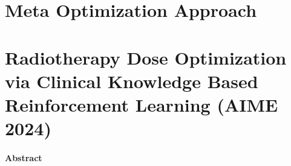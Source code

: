 \section{Meta Optimization Approach}

\section{Radiotherapy Dose Optimization via Clinical Knowledge Based Reinforcement Learning (AIME 2024)}
\paragraph{Abstract}
%

